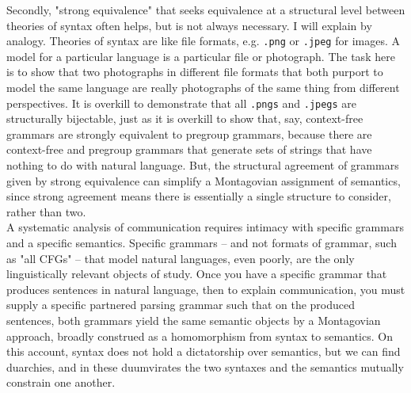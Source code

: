 \begin{fullwidth}
Secondly, "strong equivalence" that seeks equivalence at a structural level between theories of syntax often helps, but is not always necessary. I will explain by analogy. Theories of syntax are like file formats, e.g. \texttt{.png} or \texttt{.jpeg} for images. A model for a particular language is a particular file or photograph. The task here is to show that two photographs in different file formats that both purport to model the same language are really photographs of the same thing from different perspectives. It is overkill to demonstrate that all \texttt{.pngs} and \texttt{.jpegs} are structurally bijectable, just as it is overkill to show that, say, context-free grammars are strongly equivalent to pregroup grammars, because there are context-free and pregroup grammars that generate sets of strings that have nothing to do with natural language. But, the structural agreement of grammars given by strong equivalence can simplify a Montagovian assignment of semantics, since strong agreement means there is essentially a single structure to consider, rather than two.\\

A systematic analysis of communication requires intimacy with specific grammars and a specific semantics. Specific grammars -- and not formats of grammar, such as "all CFGs" -- that model natural languages, even poorly, are the only linguistically relevant objects of study. Once you have a specific grammar that produces sentences in natural language, then to explain communication, you must supply a specific partnered parsing grammar such that on the produced sentences, both grammars yield the same semantic objects by a Montagovian approach, broadly construed as a homomorphism from syntax to semantics. On this account, syntax does not hold a dictatorship over semantics, but we can find duarchies, and in these duumvirates the two syntaxes and the semantics mutually constrain one another.\\


\end{fullwidth}
